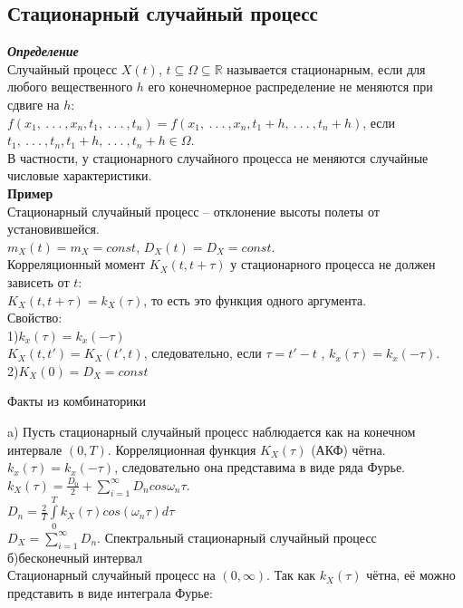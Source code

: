 \documentclass[russian, 12pt, fleqn]{article}
\begin{document}
\subsection{Стационарный случайный процесс}
\textit{\textbf{Определение}}\\ 
Случайный процесс $X(t)$, $t \subseteq \Omega \subseteq $\(\mathbb{R}\) называется стационарным, если для любого вещественного $h$ его конечномерное распределение не меняются при сдвиге на $h$:\\
$f(x_1,\ .\ .\ .\ ,x_n, t_1,\ .\ .\ .\ ,t_n) =  f(x_1,\ .\ .\ .\ ,x_n, t_1 + h,\ .\ .\ .\ ,t_n + h)$, если $t_1,\ .\ .\ .\ , t_n, t_1 + h,\ .\ .\ .\ ,t_n + h \in \Omega$.\\
В частности, у стационарного случайного процесса не меняются случайные числовые характеристики.\\
\textbf{Пример} \\
Стационарный случайный процесс -- отклонение высоты полеты от установившейся.\\
$m_X(t) = m_X = const$, $D_X(t) = D_X = const$.\\
Корреляционный момент $K_X(t, t + \tau)$ у стационарного процесса не должен зависеть от $t$:\\
$K_X(t, t + \tau) = k_X(\tau)$, то есть это функция одного аргумента.\\
Свойство:\\
1)$k_x(\tau) = k_x(-\tau)$\\
$K_X(t, t') = K_X(t', t)$, следовательно, если $\tau = t' - t$ , $k_x(\tau) = k_x(-\tau)$.\\
2)$K_X(0) = D_X = const$\\
\begin{center}
$\textbf{Факты из комбинаторики}$
\end{center}
a) Пусть стационарный случайный процесс наблюдается как на конечном интервале $(0, T)$. Корреляционная функция $K_X(\tau)$ (АКФ) чётна. $k_x(\tau) = k_x(-\tau)$, следовательно она представима в виде ряда Фурье. $k_X(\tau) = \frac{D_0}{2} +  \displaystyle{\sum \limits_{i = 1}^{\infty}} D_n cos \omega_n \tau$.\\
$D_n = \frac{2}{T} \displaystyle{\int \limits _{0} ^ {T}} k_X (\tau) cos(\omega_n \tau) d\tau$\\
$D_X =   \displaystyle{\sum \limits_{i = 1}^{\infty}} D_n$.
Спектральный стационарный случайный процесс\\
б)бесконечный интервал\\
Стационарный случайный процесс на $(0, \infty)$. Так как $k_X(\tau)$ чётна, её можно представить в виде интеграла Фурье:\\
\end{document}
